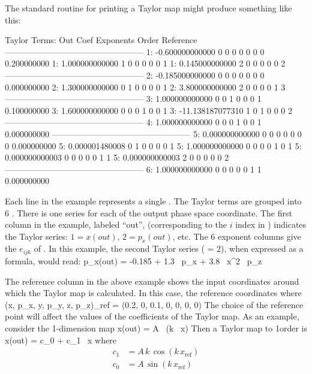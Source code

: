 The standard \bmad routine for printing a Taylor map might produce something 
like this: 
\begin{example}
   Taylor Terms:
   Out      Coef             Exponents          Order       Reference
   --------------------------------------------------
    1:     -0.600000000000   0  0  0  0  0  0       0       0.200000000
    1:      1.000000000000   1  0  0  0  0  0       1
    1:      0.145000000000   2  0  0  0  0  0       2
   --------------------------------------------------
    2:     -0.185000000000   0  0  0  0  0  0       0       0.000000000
    2:      1.300000000000   0  1  0  0  0  0       1
    2:      3.800000000000   2  0  0  0  0  1       3
   --------------------------------------------------
    3:      1.000000000000   0  0  1  0  0  0       1       0.100000000
    3:      1.600000000000   0  0  0  1  0  0       1
    3:    -11.138187077310   1  0  1  0  0  0       2
   --------------------------------------------------
    4:      1.000000000000   0  0  0  1  0  0       1       0.000000000
   --------------------------------------------------
    5:      0.000000000000   0  0  0  0  0  0       0       0.000000000
    5:      0.000001480008   0  1  0  0  0  0       1
    5:      1.000000000000   0  0  0  0  1  0       1
    5:      0.000000000003   0  0  0  0  0  1       1
    5:      0.000000000003   2  0  0  0  0  0       2
   --------------------------------------------------
    6:      1.000000000000   0  0  0  0  0  1       1       0.000000000
\end{example}
Each line in the example represents a single . The
Taylor terms are grouped into 6 . There is one
series for each of the output phase space coordinate. The first
column in the example, labeled ``out'', (corresponding to the $i$
index in ) indicates the Taylor series: $1 = x(out)$, $2 =
p_x(out)$, etc. The 6 exponent columns give the $e_{ijk}$ of
. In this example, the second Taylor series ( = 2),
when expressed as a formula, would read:
\Begineq
  p_x(out) = -0.185 + 1.3 \, \delta p_x + 3.8 \, \delta x^2 \, \delta p_z
\Endeq

The reference column in the above example shows the input coordinates around
which the Taylor map is calculated. In this case, the reference
coordinates where 
\Begineq
  (x, p_x, y, p_y, z, p_z)_{ref} = (0.2, 0, 0.1, 0, 0, 0, 0)
\Endeq
The choice of the reference point will affect the values of the
coefficients of the Taylor map. As an example, consider the 1-dimension map
\Begineq
  x(out) = A \, \sin(k \, \delta x)
\Endeq
Then a Taylor map to 1\St order is
\Begineq
  x(out) = c_0 + c_1 \, \delta x
\Endeq
where
\begin{align}
  c_1 &= A \, k \, \cos(k \, x_{\text{ref}}) \\
  c_0 &= A \, \sin(k \, x_{\text{ref}})
\end{align}

